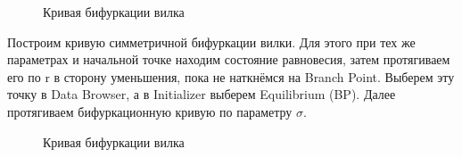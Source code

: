 \documentclass[12pt, a4paper]{article}
\begin{document}
\begin{figure}[H]
	\caption{Кривая бифуркации вилка}
\end{figure}
Построим кривую симметричной бифуркации вилки.
\newline
Для этого при тех же параметрах и начальной точке находим состояние равновесия, затем протягиваем его по r в сторону уменьшения, пока не наткнёмся на Branch Point. Выберем эту точку в Data Browser, а в Initializer выберем Equilibrium (BP). Далее протягиваем бифуркационную кривую по параметру $\sigma$.
\begin{figure}[H]
	\caption{Кривая бифуркации вилка}
\end{figure}
\end{document}
